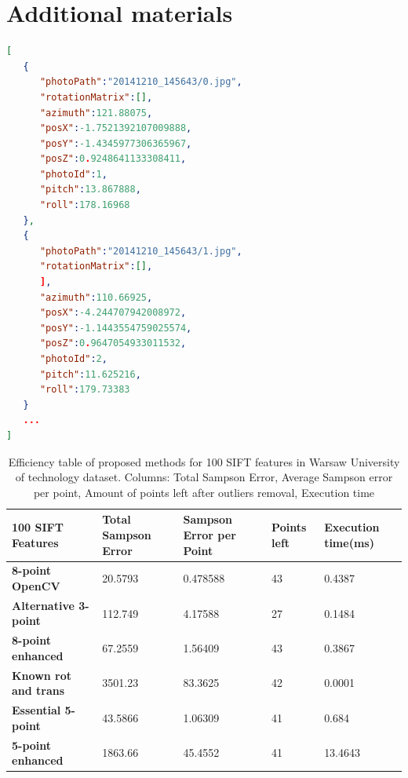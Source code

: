 \ifpdf
    \graphicspath{{figures/}{figures/comparisons}}
\else
    \graphicspath{{figures/}{figures/comparisons}}
\fi

\chapter{Additional materials} %
\begin{lstlisting}[language=json,firstnumber=1, float, label={lst:json_file} caption=Sample ''sensor.txt'' file from ''Sensor Enhanced Images Camera'' application]
[
   {
      "photoPath":"20141210_145643/0.jpg",
      "rotationMatrix":[],
      "azimuth":121.88075,
      "posX":-1.7521392107009888,
      "posY":-1.4345977306365967,
      "posZ":0.9248641133308411,
      "photoId":1,
      "pitch":13.867888,
      "roll":178.16968
   },
   {
      "photoPath":"20141210_145643/1.jpg",
      "rotationMatrix":[],
      ],
      "azimuth":110.66925,
      "posX":-4.244707942008972,
      "posY":-1.1443554759025574,
      "posZ":0.9647054933011532,
      "photoId":2,
      "pitch":11.625216,
      "roll":179.73383
   }
   ...
]
\end{lstlisting} %
\clearpage

\begin{table}[p]
\centering
\begin{adjustbox}{width=1\linewidth}
\begin{tabular}{l|l|l|l|l}
\textbf{100 SIFT Features}   & \textbf{Total Sampson Error} & \textbf{Sampson Error per Point} & \textbf{Points left} & \textbf{Execution time(ms)} \\ \hline
\textbf{8-point OpenCV}      & 20.5793             & 0.478588                & 43          & 0.4387             \\ \hline
\textbf{Alternative 3-point} & 112.749             & 4.17588                 & 27          & 0.1484             \\ \hline
\textbf{8-point enhanced}    & 67.2559             & 1.56409                 & 43          & 0.3867             \\ \hline
\textbf{Known rot and trans} & 3501.23             & 83.3625                 & 42          & 0.0001             \\ \hline
\textbf{Essential 5-point}   & 43.5866             & 1.06309                 & 41          & 0.684              \\ \hline
\textbf{5-point enhanced}    & 1863.66             & 45.4552                 & 41          & 13.4643            \\
\end{tabular}
\end{adjustbox}
\caption[Efficiency table of proposed methods for 100 SIFT features in Warsaw University of technology dataset]{Efficiency table of proposed methods for 100 SIFT features in Warsaw University of technology dataset. Columns: Total Sampson Error, Average Sampson error per point, Amount of points left after outliers removal, Execution time}
\label{table:Efficiency100Sift}
\end{table}


